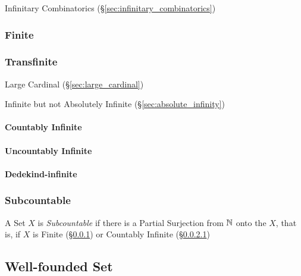 Infinitary Combinatorics (\S\ref{sec:infinitary_combinatorics})



\subsubsection{Finite}\label{sec:finite_cardinality}

\subsubsection{Transfinite}\label{sec:transfinite}

Large Cardinal (\S\ref{sec:large_cardinal})

Infinite but not Absolutely Infinite (\S\ref{sec:absolute_infinity})



\paragraph{Countably Infinite}\label{sec:countably_infinite}\hfill

\paragraph{Uncountably Infinite}\label{sec:uncountably_infinite}\hfill

\paragraph{Dedekind-infinite}\label{sec:dedekind_infinite}\hfill



\subsubsection{Subcountable}\label{sec:subcountable}

A Set $X$ is \emph{Subcountable} if there is a Partial Surjection from
$\mathbb{N}$ onto the $X$, that is, if $X$ is Finite
(\S\ref{sec:finite_cardinality}) or Countably Infinite
(\S\ref{sec:countably_infinite})



\subsection{Well-founded Set}\label{sec:wellfounded_set}

